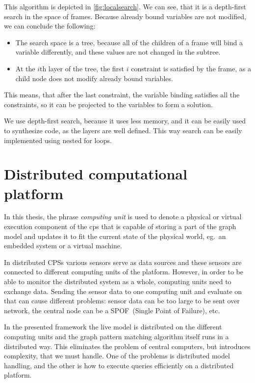 This algorithm is depicted in \autoref{fig:localsearch}. 
We can see, that it is a depth-first search in the space of frames. 
Because already bound variables are not modified, we can conclude the following:
\begin{itemize}
	\item 
	The search space is a tree, because all of the children of a frame will bind a variable differently, and these values are not changed in the subtree.
	\item
	At the $i$th layer of the tree, the first $i$ constraint is satisfied by the frame, as a child node does not modify already bound variables.
		
\end{itemize}

This means, that after the last constraint, the variable binding satisfies all the constraints, so it can be projected to the variables to form a solution.

We use depth-first search, because it uses less memory, and it can be easily used to synthesize code, as the layers are well defined. This way search can be easily implemented using nested for loops.


\section{Distributed computational platform}


In this thesis, the phrase \emph{computing unit} is used to denote a physical or virtual execution component of the cps that is capable of storing a part of the graph model and updates it to fit the current state of the physical world, eg.\ an embedded system or a virtual machine.

In distributed CPSs various sensors serve as data sources and these sensors are connected to different computing units of the platform. However, in order to be able to monitor the distributed system as a whole, computing units need to exchange data.
Sending the sensor data to one computing unit and evaluate on that can cause different problems: 
sensor data can be too large to be sent over network, the central node can be a SPOF~(Single Point of Failure), etc. 

In the presented framework the live model is distributed on the different computing units and the graph pattern matching algorithm itself runs in a distributed way. 
This eliminates the problem of central computers, but introduces complexity, that we must handle.
One of the problems is distributed model handling, and the other is how to execute queries efficiently on a distributed platform.




